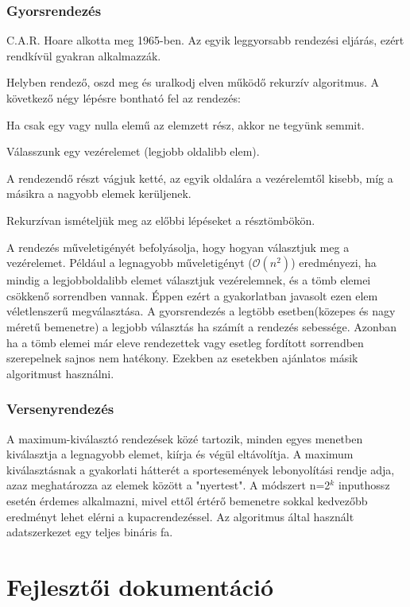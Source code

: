 \documentclass{elteikthesis}
\begin{document}
\subsection{Gyorsrendezés}
C.A.R. Hoare\cite{Horae} alkotta meg 1965-ben. Az egyik leggyorsabb rendezési eljárás, ezért rendkívül gyakran alkalmazzák.\par
Helyben rendező, oszd meg és uralkodj\cite{Cormen} elven működő rekurzív algoritmus. A következő négy lépésre bontható fel az rendezés:
\begin{description}[0.5cm]
	\item[$\bullet$] Ha csak egy vagy nulla elemű az elemzett rész, akkor ne tegyünk semmit.
	\item[$\bullet$] Válasszunk egy vezérelemet (legjobb oldalibb elem).
	\item[$\bullet$] A rendezendő részt vágjuk ketté, az egyik oldalára a vezérelemtől kisebb, míg a másikra a nagyobb elemek kerüljenek.
	\item[$\bullet$] Rekurzívan ismételjük meg az előbbi lépéseket a résztömbökön.
\end{description}
A rendezés műveletigényét befolyásolja, hogy hogyan választjuk meg a vezérelemet. Például a legnagyobb műveletigényt ($\mathcal{O}(n^2)$) eredményezi, ha mindig a legjobboldalibb elemet választjuk vezérelemnek, és a tömb elemei csökkenő sorrendben vannak. Éppen ezért a gyakorlatban javasolt ezen elem véletlenszerű megválasztása. A gyorsrendezés a legtöbb esetben(közepes és nagy méretű bemenetre) a legjobb választás ha számít a rendezés sebessége. Azonban ha a tömb elemei már eleve rendezettek vagy esetleg fordított sorrendben szerepelnek sajnos nem hatékony. Ezekben az esetekben ajánlatos másik algoritmust használni. 

\subsection{Versenyrendezés}
A maximum-kiválasztó rendezések közé tartozik, minden egyes menetben kiválasztja a legnagyobb elemet, kiírja és végül eltávolítja. A maximum kiválasztásnak a gyakorlati hátterét a sportesemények lebonyolítási rendje adja, azaz meghatározza az elemek között a "nyertest". A módszert n=2$^k$ inputhossz esetén érdemes alkalmazni, mivel ettől értérő bemenetre sokkal kedvezőbb eredményt lehet elérni a kupacrendezéssel. Az algoritmus által használt adatszerkezet egy teljes bináris fa.

\chapter{Fejlesztői dokumentáció}
\end{document}
